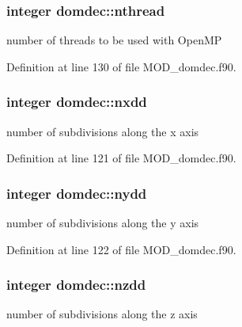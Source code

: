 \hypertarget{classdomdec_ad51e73bb1764f6f3e48bce4c4b6636ff}{
\subsubsection[{nthread}]{\setlength{\rightskip}{0pt plus 5cm}integer domdec\-::nthread}}\label{classdomdec_ad51e73bb1764f6f3e48bce4c4b6636ff}


number of threads to be used with Open\-M\-P 



Definition at line 130 of file M\-O\-D\-\_\-domdec.\-f90.

\hypertarget{classdomdec_a867d499309342702baee7bd2f4dd72ae}{
\subsubsection[{nxdd}]{\setlength{\rightskip}{0pt plus 5cm}integer domdec\-::nxdd}}\label{classdomdec_a867d499309342702baee7bd2f4dd72ae}


number of subdivisions along the x axis 



Definition at line 121 of file M\-O\-D\-\_\-domdec.\-f90.

\hypertarget{classdomdec_a6811e1e01bd9ca743778b5dd16be7675}{
\subsubsection[{nydd}]{\setlength{\rightskip}{0pt plus 5cm}integer domdec\-::nydd}}\label{classdomdec_a6811e1e01bd9ca743778b5dd16be7675}


number of subdivisions along the y axis 



Definition at line 122 of file M\-O\-D\-\_\-domdec.\-f90.

\hypertarget{classdomdec_ae136589c89f0840e0c70674031d3b777}{
\subsubsection[{nzdd}]{\setlength{\rightskip}{0pt plus 5cm}integer domdec\-::nzdd}}\label{classdomdec_ae136589c89f0840e0c70674031d3b777}


number of subdivisions along the z axis 



